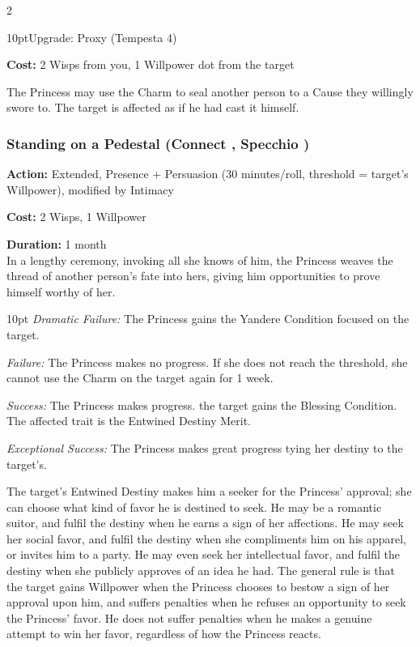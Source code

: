 \begin{multicols}{2}
\begin{myindentpar}{10pt}Upgrade: Proxy (Tempesta 4)

\noindent \textbf{Cost:} 2 Wisps from you, 1 Willpower dot from the target

The Princess may use the Charm to seal another person to a Cause they willingly swore to. The target is affected as if he had cast it himself.\end{myindentpar}

\subsubsection*{Standing on a Pedestal (Connect \textbullet\textbullet\textbullet\textbullet, Specchio \textbullet\textbullet\textbullet)}

\noindent \textbf{Action:} Extended, Presence + Persuasion (30 minutes/roll, threshold = target's Willpower), modified by Intimacy

\noindent \textbf{Cost:} 2 Wisps, 1 Willpower

\noindent \textbf{Duration:} 1 month \\

\noindent In a lengthy ceremony, invoking all she knows of him, the Princess weaves the thread of another person's fate into hers, giving him opportunities to prove himself worthy of her.

\begin{myindentpar}{10pt}        \emph{Dramatic Failure:} The Princess gains the Yandere Condition focused on the target.

        \emph{Failure:} The Princess makes no progress. If she does not reach the threshold, she cannot use the Charm on the target again for 1 week.

        \emph{Success:} The Princess makes progress. the target gains the Blessing Condition. The affected trait is the Entwined Destiny Merit.

        \emph{Exceptional Success:} The Princess makes great progress tying her destiny to the target's.\end{myindentpar}

The target's Entwined Destiny makes him a seeker for the Princess' approval; she can choose what kind of favor he is destined to seek. He may be a romantic suitor, and fulfil the destiny when he earns a sign of her affections. He may seek her social favor, and fulfil the destiny when she compliments him on his apparel, or invites him to a party. He may even seek her intellectual favor, and fulfil the destiny when she publicly approves of an idea he had. The general rule is that the target gains Willpower when the Princess chooses to bestow a sign of her approval upon him, and suffers penalties when he refuses an opportunity to seek the Princess' favor. He does not suffer penalties when he makes a genuine attempt to win her favor, regardless of how the Princess reacts.


\end{multicols}
